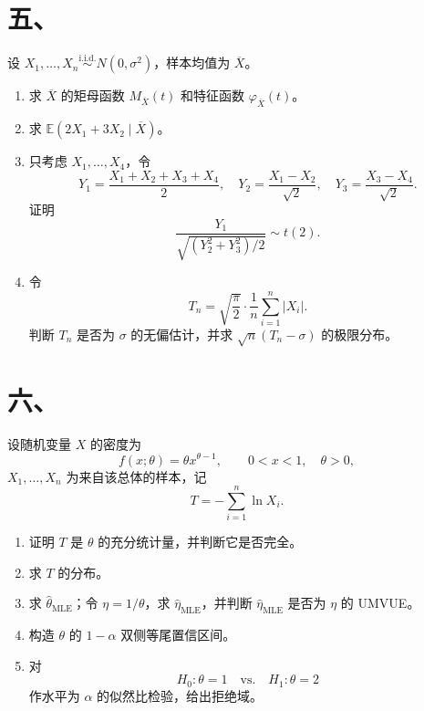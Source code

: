 \documentclass[UTF8,zihao=-4,fontset=windows]{ctexart}
\newcommand{\EX}{\mathbb E}
\newcommand{\iid}{\overset{\mathrm{i.i.d.}}{\sim}}
\begin{document}
\section*{五、}
设 $X_1,\ldots,X_n \iid N(0,\sigma^2)$，样本均值为 $\overline X$。
\begin{enumerate}
  \item 求 $\overline X$ 的矩母函数 $M_{\overline X}(t)$ 和特征函数 $\varphi_{\overline X}(t)$。
  \item 求 $\EX(2X_1+3X_2\mid \overline X)$。
  \item 只考虑 $X_1,\ldots,X_4$，令
  \[
    Y_1=\frac{X_1+X_2+X_3+X_4}{2},\quad
    Y_2=\frac{X_1-X_2}{\sqrt2},\quad
    Y_3=\frac{X_3-X_4}{\sqrt2}.
  \]
  证明
  \[
    \frac{Y_1}{\sqrt{(Y_2^2+Y_3^2)/2}}\sim t(2).
  \]
  \item 令
  \[
    T_n=\sqrt{\frac{\pi}{2}}\cdot \frac1n\sum_{i=1}^n |X_i|.
  \]
  判断 $T_n$ 是否为 $\sigma$ 的无偏估计，并求 $\sqrt n(T_n-\sigma)$ 的极限分布。
\end{enumerate}

\section*{六、}
设随机变量 $X$ 的密度为
\[
  f(x;\theta)=\theta x^{\theta-1},\qquad 0<x<1,\quad \theta>0,
\]
$X_1,\ldots,X_n$ 为来自该总体的样本，记
\[
  T=-\sum_{i=1}^n \ln X_i.
\]
\begin{enumerate}
  \item 证明 $T$ 是 $\theta$ 的充分统计量，并判断它是否完全。
  \item 求 $T$ 的分布。
  \item 求 $\hat\theta_{\mathrm{MLE}}$；令 $\eta=1/\theta$，求 $\hat\eta_{\mathrm{MLE}}$，并判断 $\hat\eta_{\mathrm{MLE}}$ 是否为 $\eta$ 的 UMVUE。
  \item 构造 $\theta$ 的 $1-\alpha$ 双侧等尾置信区间。
  \item 对
  \[
    H_0:\theta=1\quad \text{vs.}\quad H_1:\theta=2
  \]
  作水平为 $\alpha$ 的似然比检验，给出拒绝域。
\end{enumerate}
\end{document}
